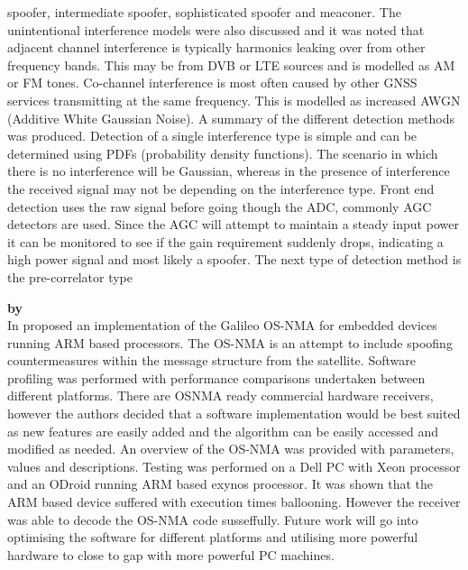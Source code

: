 spoofer, intermediate spoofer, sophisticated spoofer and meaconer. The unintentional interference models were also discussed and it was noted that adjacent channel
interference is typically harmonics leaking over from other frequency bands. This may be from DVB or LTE sources and is modelled as AM or FM tones. Co-channel
interference is most often caused by other GNSS services transmitting at the same frequency. This is modelled as increased AWGN (Additive White Gaussian Noise). A summary
of the different detection methods was produced. Detection of a single interference type is simple and can be determined using PDFs (probability density functions). The
scenario in which there is no interference will be Gaussian, whereas in the presence of interference the received signal may not be depending on the interference type.
Front end detection uses the raw signal before going though the ADC, commonly AGC detectors are used. Since the AGC will attempt to maintain a steady input power it can
be monitored to see if the gain requirement suddenly drops, indicating a high power signal and most likely a spoofer. The next type of detection method is the
pre-correlator type 

\medskip

\textbf{\emph{} by \citeauthor{RN36}} \\
In \citeyear{RN36} \citeauthor{RN36} \cite{RN36} proposed an implementation of the Galileo OS-NMA for embedded devices running ARM based processors. The OS-NMA is an
attempt to include spoofing countermeasures within the message structure from the satellite. Software profiling was performed with performance comparisons undertaken
between different platforms. There are OSNMA ready commercial hardware receivers, however the authors decided that a software implementation would be best suited as new
features are easily added and the algorithm can be easily accessed and modified as needed. An overview of the OS-NMA was provided with parameters, values and
descriptions. Testing was performed on a Dell PC with Xeon processor and an ODroid running ARM based exynos processor. It was shown that the ARM based device suffered
with execution times ballooning. However the receiver was able to decode the OS-NMA code susseffully. Future work will go into optimising the software for different
platforms and utilising more powerful hardware to close to gap with more powerful PC machines.

\medskip

